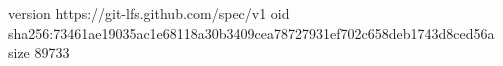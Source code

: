 version https://git-lfs.github.com/spec/v1
oid sha256:73461ae19035ac1e68118a30b3409cea78727931ef702c658deb1743d8ced56a
size 89733
